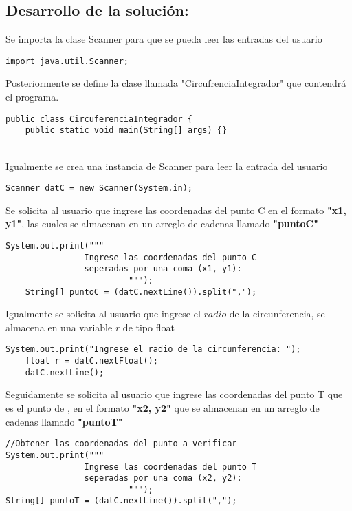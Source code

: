 \subsection{\textbf{Desarrollo de la solución:}}

Se importa la clase Scanner para que se pueda leer las entradas del usuario
\begin{lstlisting}[style=javaStyle]
import java.util.Scanner;
\end{lstlisting}

Posteriormente se define la clase llamada "CircufrenciaIntegrador" que contendrá el programa.
\begin{lstlisting}[style=javaStyle]
    public class CircuferenciaIntegrador {
    public static void main(String[] args) {} 
\end{lstlisting}\\

Igualmente se crea una instancia de Scanner para leer la entrada del usuario
\begin{lstlisting}[style=javaStyle]
Scanner datC = new Scanner(System.in);
\end{lstlisting}

Se solicita al usuario que ingrese las coordenadas del punto C en el formato \textbf{"x1, y1"}, las cuales se almacenan en un arreglo de cadenas llamado \textbf{"puntoC"}
\begin{lstlisting}[style=javaStyle]
System.out.print("""
                Ingrese las coordenadas del punto C 
                seperadas por una coma (x1, y1):
                         """);
    String[] puntoC = (datC.nextLine()).split(",");
\end{lstlisting}

Igualmente se solicita al usuario que ingrese el $radio$ de la circunferencia, se almacena en una variable $r$ de tipo float
\begin{lstlisting}[style=javaStyle]
System.out.print("Ingrese el radio de la circunferencia: ");
    float r = datC.nextFloat();
    datC.nextLine();  
\end{lstlisting}

Seguidamente se solicita al usuario que ingrese las coordenadas del punto T que es el punto de , en el formato \textbf{"x2, y2"} que se almacenan en un arreglo de cadenas llamado \textbf{"puntoT"}
\begin{lstlisting}[style=javaStyle]
//Obtener las coordenadas del punto a verificar
System.out.print("""
                Ingrese las coordenadas del punto T
                seperadas por una coma (x2, y2): 
                         """);
String[] puntoT = (datC.nextLine()).split(",");
\end{lstlisting}

